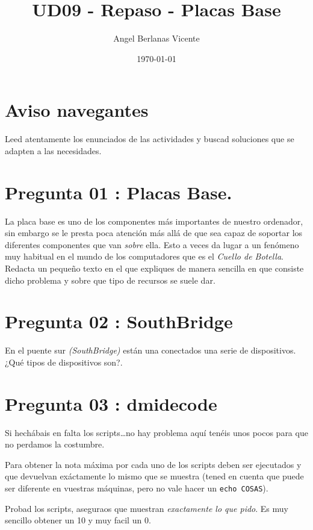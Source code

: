 \documentclass[11pt]{article}
\author{Angel Berlanas Vicente}
\date{\today}
\title{UD09 - Repaso - Placas Base}
\begin{document}
\maketitle
\tableofcontents


\section{Aviso navegantes}
\label{sec:orgb77d332}

Leed atentamente los enunciados de las actividades y buscad soluciones que se
adapten a las necesidades.

\section{Pregunta 01 : Placas Base.}
\label{sec:orgcdd6b4c}

La placa base es uno de los componentes más importantes de nuestro ordenador,
sin embargo se le presta poca atención más allá de que sea capaz de soportar
los diferentes componentes que van \emph{sobre} ella. Esto a veces da lugar a un
fenómeno muy habitual en el mundo de los computadores que es el \emph{Cuello de
Botella}. Redacta un pequeño texto en el que expliques de manera sencilla en
que consiste dicho problema y sobre que tipo de recursos se suele dar.

\section{Pregunta 02 : SouthBridge}
\label{sec:orgf347f0d}

En el puente sur \emph{(SouthBridge)} están una conectados una serie de
dispositivos. ¿Qué tipos de dispositivos son?. 

\section{Pregunta 03 : dmidecode}
\label{sec:orga0c3e66}

Si hechábais en falta los scripts\ldots{}no hay problema aquí tenéis unos pocos
para que no perdamos la costumbre.

Para obtener la nota máxima por cada uno de los scripts deben ser ejecutados y
que devuelvan exáctamente lo mismo que se muestra (tened en cuenta que puede
ser diferente en vuestras máquinas, pero no vale hacer un \texttt{echo COSAS}).

Probad los scripts, aseguraos que muestran \emph{exactamente lo que pido}. Es muy
sencillo obtener un 10 y muy facil un 0.
\end{document}
